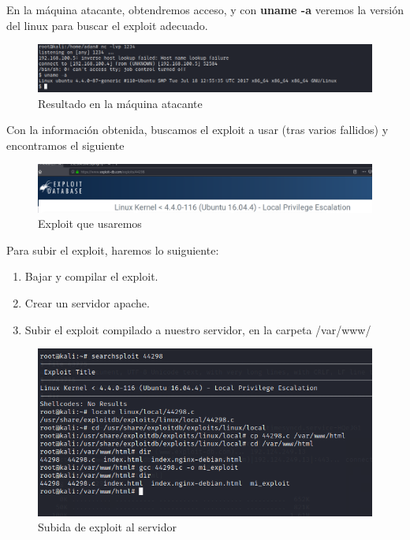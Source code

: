\documentclass[12pt,twoside]{article}
\begin{document}
En la máquina atacante, obtendremos acceso, y con \textbf{uname -a} veremos la versión del linux para buscar el exploit adecuado.
\begin{figure}[h]
    \centering
    \includegraphics[scale=0.45]{./imagenes/maquina_atacante}
    \caption{Resultado en la máquina atacante}
\end{figure}

Con la información obtenida, buscamos el exploit a usar (tras varios fallidos) y encontramos el siguiente

\begin{figure}[h]
    \centering
    \includegraphics[scale=0.25]{./imagenes/exploit_a_usar}
    \caption{Exploit que usaremos}
\end{figure}

Para subir el exploit, haremos lo suiguiente:
\begin{enumerate}
    \item Bajar y compilar el exploit. 
    \item Crear un servidor apache.
    \item Subir el exploit compilado a nuestro servidor, en la carpeta /var/www/
\end{enumerate}
\newpage
\begin{figure}[h]
    \centering
    \includegraphics[scale=0.5]{./imagenes/subir_exploit_a_server}
    \caption{Subida de exploit al servidor}
\end{figure}
\end{document}
